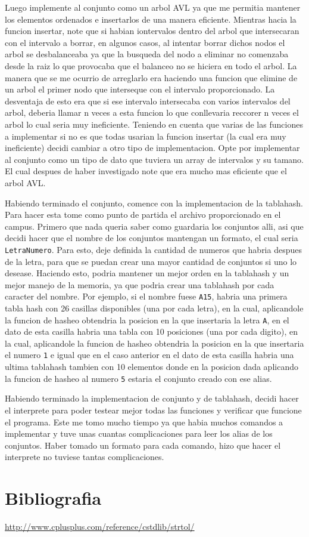 \documentclass[]{article}
\begin{document}
Luego implemente al conjunto como un arbol AVL ya que me permitia mantener los elementos ordenados e insertarlos de una manera eficiente. Mientras hacia la funcion insertar, note que si habian iontervalos dentro del arbol que intersecaran con el intervalo a borrar, en algunos casos, al intentar borrar dichos nodos el arbol se desbalanceaba ya que la busqueda del nodo a eliminar no comenzaba desde la raiz lo que provocaba que el balanceo no se hiciera en todo el arbol. La manera que se me ocurrio de arreglarlo era haciendo una funcion que elimine de un arbol el primer nodo que interseque con el intervalo proporcionado. La desventaja de esto era que si ese intervalo intersecaba con varios intervalos del arbol, deberia llamar n veces a esta funcion lo que conllevaria reccorer n veces el arbol lo cual seria muy ineficiente. Teniendo en cuenta que varias de las funciones a implementar si no es que todas usarian la funcion insertar (la cual era muy ineficiente) decidi cambiar a otro tipo de implementacion. Opte por implementar al conjunto como un tipo de dato que tuviera un array de intervalos y su tamano. El cual despues de haber investigado note que era mucho mas eficiente que el arbol AVL.

Habiendo terminado el conjunto, comence con la implementacion de la tablahash. Para hacer esta tome como punto de partida el archivo proporcionado en el campus. Primero que nada queria saber como guardaria los conjuntos alli, asi que decidi hacer que el nombre de los conjuntos mantengan un formato, el cual seria \verb|LetraNumero|. Para esto, deje definida la cantidad de numeros que habria despues de la letra, para que se puedan crear una mayor cantidad de conjuntos si uno lo desease. Haciendo esto, podria mantener un mejor orden en la tablahash y un mejor manejo de la memoria, ya que podria crear una tablahash por cada caracter del nombre.
Por ejemplo, si el nombre fuese \verb|A15|, habria una primera tabla hash con 26 casillas disponibles (una por cada letra), en la cual, aplicandole la funcion de hasheo obtendria la posicion en la que insertaria la letra \verb|A|, en el dato de esta casilla habria una tabla con 10 posiciones (una por cada digito), en la cual, aplicandole la funcion de hasheo obtendria la posicion en la que insertaria el numero \verb|1| e igual que en el caso anterior en el dato de esta casilla habria una ultima tablahash tambien con 10 elementos donde en la posicion dada aplicando la funcion de hasheo al numero \verb|5| estaria el conjunto creado con ese alias.

Habiendo terminado la implementacion de conjunto y de tablahash, decidi hacer el interprete para poder testear mejor todas las funciones y verificar que funcione el programa. Este me tomo mucho tiempo ya que habia muchos comandos a implementar y tuve unas cuantas complicaciones para leer los alias de los conjuntos. Haber tomado un formato para cada comando, hizo que hacer el interprete no tuviese tantas complicaciones.
\newpage
\section{Bibliografia}
\url{http://www.cplusplus.com/reference/cstdlib/strtol/}\\
\end{document}
